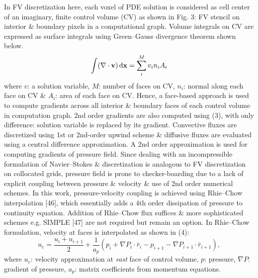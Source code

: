 \documentclass{article}
\begin{document}
\begin{itemize}
\begin{itemize}
		In FV discretization here, each voxel of PDE solution is considered as cell center of an imaginary, finite control volume (CV) as shown in {\sf Fig. 3: FV stencil on interior \& boundary pixels in a computational graph}. Volume integrals on CV are expressed as surface integrals using Green--Gauss divergence theorem shown below.
		\begin{equation}
			\int (\nabla\cdot{\bf v})\,{\rm d}{\bf x} = \sum_i^M v_in_iA_i
		\end{equation}
		where $v$: a solution variable, $M$: number of faces on CV, $n_i$: normal along each face on CV \& $A_i$: area of each face on CV. Hence, a face-based approach is used to compute gradients across all interior \& boundary faces of each control volume in computation graph. 2nd order gradients are also computed using (3), with only difference: solution variable is replaced by its gradient. Convective fluxes are discretized using 1st or 2nd-order upwind scheme \& diffusive fluxes are evaluated using a central difference approximation. A 2nd order approximation is used for computing gradients of pressure field. Since dealing with an incompressible formulation of Navier--Stokes \& discretization is analogous to FV discretization on collocated grids, pressure field is prone to checker-boarding due to a lack of explicit coupling between pressure \& velocity \& use of 2nd order numerical schemes. In this work, pressure-velocity coupling is achieved using Rhie--Chow interpolation [46], which essentially adds a 4th order dissipation of pressure to continuity equation. Addition of Rhie--Chow flux suffices \& more sophisticated schemes e.g. SIMPLE [47] are not required but remain an option. In Rhie--Chow formulation, velocity at faces is interpolated as shown in (4):
		\begin{equation}
			u_e = \frac{u_i + u_{i+1}}{2} + \frac{1}{a_p}(p_i + \nabla P_i\cdot\bar{r}_i - p_{i+1} - \nabla P_{i+1}\cdot\bar{r}_{i+1}),
		\end{equation}
		where $u_e$: velocity approximation at {\it east} face of control volume, $p$: pressure, $\nabla P$: gradient of pressure, $a_p$: matrix coefficients from momentum equations.
		

\end{itemize}
\end{itemize}
\end{document}
